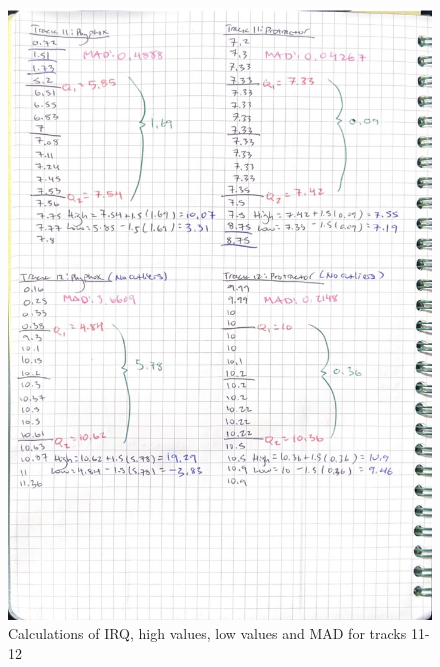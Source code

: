 \documentclass[idxtotoc,hyperref,openany]{labbook} %
\begin{document}
\begin{figure}[H] %
\begin{center}
\includegraphics[width=0.9\linewidth]{images/Lab.01/PhyProTrack11-12.png}
\end{center}
\caption{Calculations of IRQ, high values, low values and MAD for tracks 11-12}
\label{fig:Track11-12PhyphoxProtractor}
\end{figure}
\end{document}
